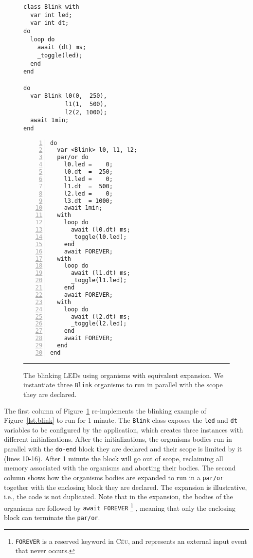 \documentclass{sig-alternate-ipsn13}
\newcommand{\CEU}{\textsc{C\'{e}u}\xspace}
\newcommand{\code}[1] {{\small{\texttt{#1}}}}
\begin{document}
\begin{figure}[t]
\begin{minipage}[t]{0.45\linewidth}
\begin{lstlisting}
class Blink with
  var int led;
  var int dt;
do
  loop do
    await (dt) ms;
    _toggle(led);
  end
end

do
  var Blink l0(0,  250),
            l1(1,  500),
            l2(2, 1000);
  await 1min;
end
\end{lstlisting}
\end{minipage}
%
\hspace{0.0cm}
%
\begin{minipage}[t]{0.45\linewidth}
\begin{lstlisting}[numbers=left,xleftmargin=0em]
do
  var <Blink> l0, l1, l2;
  par/or do
    l0.led =    0;
    l0.dt  =  250;
    l1.led =    0;
    l1.dt  =  500;
    l2.led =    0;
    l3.dt  = 1000;
    await 1min;
  with
    loop do
      await (l0.dt) ms;
      _toggle(l0.led);
    end
    await FOREVER;
  with
    loop do
      await (l1.dt) ms;
      _toggle(l1.led);
    end
    await FOREVER;
  with
    loop do
      await (l2.dt) ms;
      _toggle(l2.led);
    end
    await FOREVER;
  end
end
\end{lstlisting}
\end{minipage}
\rule{8.6cm}{0.37pt}
\caption{ The blinking LEDs using organisms with equivalent expansion.\newline
{\small %
We instantiate three \code{Blink} organisms to run in parallel with the scope 
they are declared.
}%
\label{lst.blink.orgs}
}
\end{figure}

The first column of Figure~\ref{lst.blink.orgs} re-implements the blinking 
example of Figure~\ref{lst.blink} to run for 1 minute.
%
The \code{Blink} class exposes the \code{led} and \code{dt} variables to be 
configured by the application, which creates three instances with different 
initializations.
%
After the initializations, the organisms bodies run in parallel with the 
\code{do-end} block they are declared and their scope is limited by it (lines 
10-16).
%
After 1 minute the block will go out of scope, reclaiming all memory associated 
with the organisms and aborting their bodies.
%
The second column shows how the organisms bodies are expanded to run in a 
\code{par/or} together with the enclosing block they are declared.
The expansion is illustrative, i.e., the code is not duplicated.
Note that in the expansion, the bodies of the organisms are followed by 
\code{await~FOREVER}%
\footnote{\code{FOREVER} is a reserved keyword in \CEU, and represents an 
external input event that never occurs.}%
, meaning that only the enclosing block can terminate the \code{par/or}.
\end{document}
